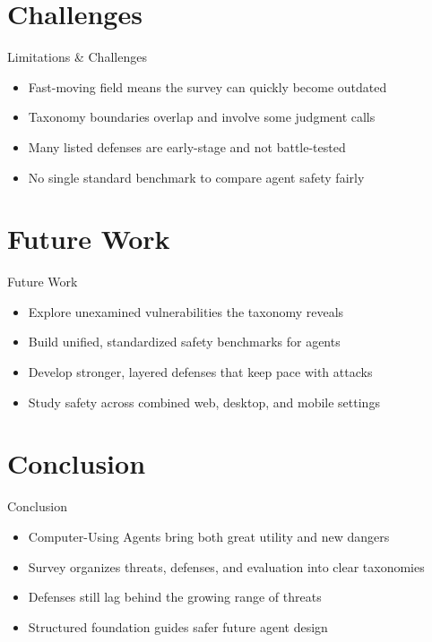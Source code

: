 \documentclass[10pt]{beamer}
\begin{document}
\section{Challenges}
\begin{frame}{Limitations \& Challenges}
\begin{itemize}
  \item Fast-moving field means the survey can quickly become outdated
  \item Taxonomy boundaries overlap and involve some judgment calls
  \item Many listed defenses are early-stage and not battle-tested
  \item No single standard benchmark to compare agent safety fairly
\end{itemize}
\end{frame}

\section{Future Work}
\begin{frame}{Future Work}
\begin{itemize}
  \item Explore unexamined vulnerabilities the taxonomy reveals
  \item Build unified, standardized safety benchmarks for agents
  \item Develop stronger, layered defenses that keep pace with attacks
  \item Study safety across combined web, desktop, and mobile settings
\end{itemize}
\end{frame}

\section{Conclusion}
\begin{frame}{Conclusion}
\begin{itemize}
  \item Computer-Using Agents bring both great utility and new dangers
  \item Survey organizes threats, defenses, and evaluation into clear taxonomies
  \item Defenses still lag behind the growing range of threats
  \item Structured foundation guides safer future agent design
\end{itemize}
\end{frame}
\end{document}
